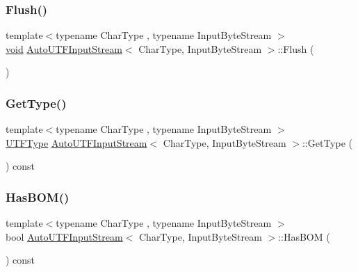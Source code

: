 \subsubsection{\texorpdfstring{Flush()}{Flush()}}
{\footnotesize\ttfamily template$<$typename Char\+Type , typename Input\+Byte\+Stream $>$ \\
\hyperlink{imgui__impl__opengl3__loader_8h_ac668e7cffd9e2e9cfee428b9b2f34fa7}{void} \hyperlink{classAutoUTFInputStream}{Auto\+U\+T\+F\+Input\+Stream}$<$ Char\+Type, Input\+Byte\+Stream $>$\+::Flush (\begin{DoxyParamCaption}{ }\end{DoxyParamCaption})\hspace{0.3cm}{\ttfamily [inline]}}

\mbox{\label{classAutoUTFInputStream_ad8e8b71e852db11a841fbba40431c5d1}} 
\subsubsection{\texorpdfstring{Get\+Type()}{GetType()}}
{\footnotesize\ttfamily template$<$typename Char\+Type , typename Input\+Byte\+Stream $>$ \\
\hyperlink{encodings_8h_ac9448aedf514a5bb509bae73a9ce4e58}{U\+T\+F\+Type} \hyperlink{classAutoUTFInputStream}{Auto\+U\+T\+F\+Input\+Stream}$<$ Char\+Type, Input\+Byte\+Stream $>$\+::Get\+Type (\begin{DoxyParamCaption}{ }\end{DoxyParamCaption}) const\hspace{0.3cm}{\ttfamily [inline]}}

\mbox{\label{classAutoUTFInputStream_a8831def623c28a3ec1d59b75abe5b20e}} 
\subsubsection{\texorpdfstring{Has\+B\+O\+M()}{HasBOM()}}
{\footnotesize\ttfamily template$<$typename Char\+Type , typename Input\+Byte\+Stream $>$ \\
bool \hyperlink{classAutoUTFInputStream}{Auto\+U\+T\+F\+Input\+Stream}$<$ Char\+Type, Input\+Byte\+Stream $>$\+::Has\+B\+OM (\begin{DoxyParamCaption}{ }\end{DoxyParamCaption}) const\hspace{0.3cm}{\ttfamily [inline]}}

